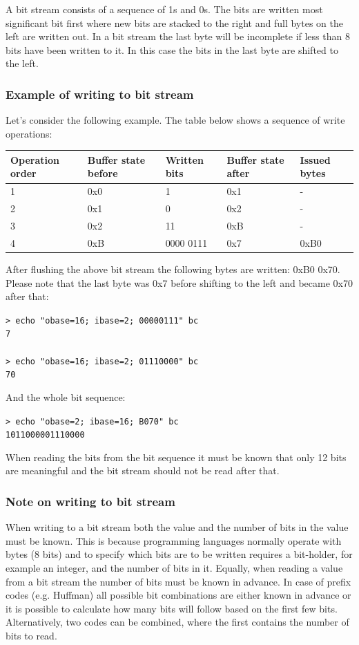 \documentclass[a4paper]{article}
\begin{document}
A bit stream consists of a sequence of 1s and 0s. The bits are written most significant 
bit first where new bits are stacked to the right and full bytes on the left are 
written out. In a bit stream the last byte will be incomplete if less than 8 bits 
have been written to it. In this case the bits in the last byte are shifted to 
the left.

\subsubsection*{Example of writing to bit stream}

Let's consider the following example. The table below shows a sequence of write 
operations: 

\begin{tabular}{|l|l|l|l|l|}
\hline
\textbf{Operation order} & \textbf{Buffer state before} & \textbf{Written bits} & \textbf{Buffer state after} & \textbf{Issued bytes}\tabularnewline
\hline
1 & 0x0 & 1 & 0x1 & -\tabularnewline
\hline
2 & 0x1 & 0 & 0x2 & -\tabularnewline
\hline
3 & 0x2 & 11 & 0xB & -\tabularnewline
\hline
4 & 0xB & 0000 0111 & 0x7 & 0xB0\tabularnewline
\hline
\end{tabular}

After flushing the above bit stream the following bytes are written: 0xB0 0x70. 
Please note that the last byte was 0x7 before shifting to the left and became 0x70 
after that:

\texttt{> echo "obase=16; ibase=2; 00000111" \textbar{} bc\\
7\\
\\
> echo "obase=16; ibase=2; 01110000" \textbar{} bc\\
70}

And the whole bit sequence: 

\texttt{> echo "obase=2; ibase=16; B070" \textbar{} bc\\
1011000001110000}

When reading the bits from the bit sequence it must be known that only 12 bits 
are meaningful and the bit stream should not be read after that. 

\subsubsection*{Note on writing to bit stream}

When writing to a bit stream both the value and the number of bits in the value 
must be known. This is because programming languages normally operate with bytes 
(8 bits) and to specify which bits are to be written requires a bit-holder, for 
example an integer, and the number of bits in it. Equally, when reading a value 
from a bit stream the number of bits must be known in advance. In case of prefix 
codes (e.g. Huffman) all possible bit combinations are either known in advance 
or it is possible to calculate how many bits will follow based on the first few 
bits. Alternatively, two codes can be combined, where the first contains the number 
of bits to read. 
\end{document}
